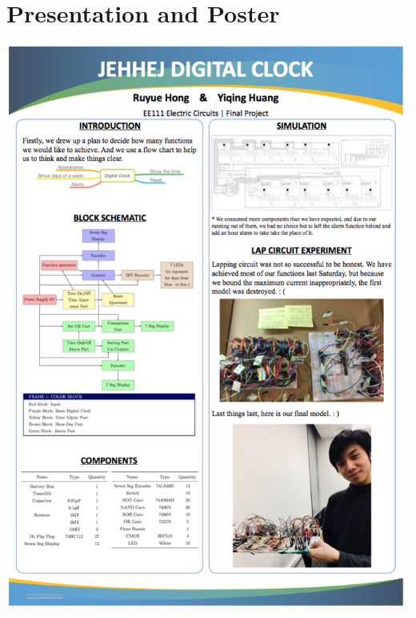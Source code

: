 \documentclass[12pt]{article}
\begin{document}
\section{Presentation and Poster}
\includegraphics[scale=1]{poster.png}
\end{document}
